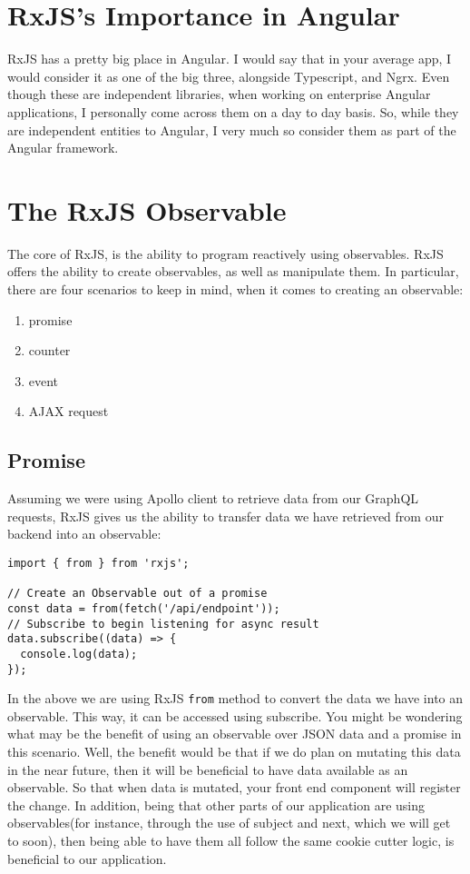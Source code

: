 \section{ RxJS's Importance in Angular }
RxJS has a pretty big place in Angular. I would say that in your average app, 
I would consider it as one of the big three, alongside Typescript, and Ngrx. 
Even though these are independent libraries, when working on enterprise Angular
applications, I personally come across them on a day to day basis. So, while 
they are independent entities to Angular, I very much so consider them as part 
of the Angular framework. 

\section{ The RxJS Observable }
The core of RxJS, is the ability to program reactively using observables. RxJS 
offers the ability to create observables, as well as manipulate them. In 
particular, there are four scenarios to keep in mind, when it comes to creating
an observable: 
\begin{enumerate}
  \item promise
  \item counter
  \item event
  \item AJAX request
\end{enumerate}

\subsection{ Promise }
Assuming we were using Apollo client to retrieve data from our GraphQL 
requests, RxJS gives us the ability to transfer data we have retrieved from our
backend into an observable: 
\begin{lstlisting}
import { from } from 'rxjs';

// Create an Observable out of a promise
const data = from(fetch('/api/endpoint'));
// Subscribe to begin listening for async result
data.subscribe((data) => {
  console.log(data);
});  
\end{lstlisting}

In the above we are using RxJS \lstinline{from} method to convert the data we
have into an observable. This way, it can be accessed using subscribe. You 
might be wondering what may be the benefit of using an observable over JSON 
data and a promise in this scenario. Well, the benefit would be that if we do 
plan on mutating this data in the near future, then it will be beneficial to 
have data available as an observable. So that when data is mutated, your 
front end component will register the change. In addition, being that other parts 
of our application are using observables(for instance, through the use of 
subject and next, which we will get to soon), then being able to have them all
follow the same cookie cutter logic, is beneficial to our application. 


